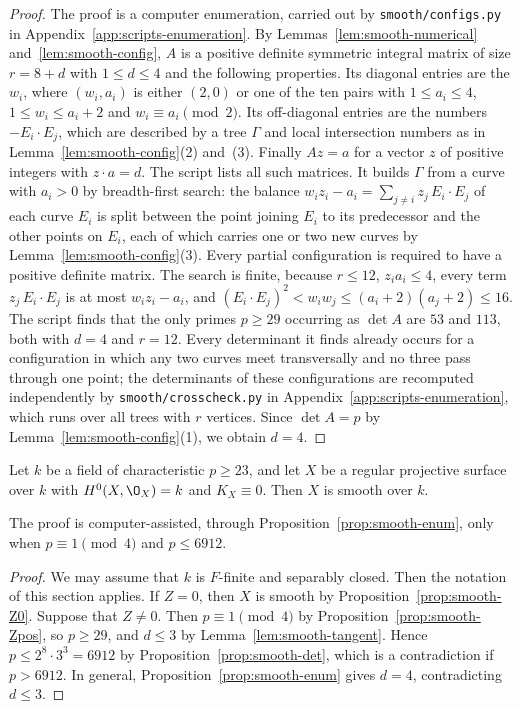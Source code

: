 \begin{proof}
The proof is a computer enumeration, carried out by \texttt{smooth/configs.py} in Appendix~\ref{app:scripts-enumeration}.
By Lemmas~\ref{lem:smooth-numerical} and~\ref{lem:smooth-config}, $A$ is a positive definite symmetric integral matrix of size $r = 8+d$ with $1\leq d\leq 4$ and the following properties.
Its diagonal entries are the $w_i$, where $(w_i,a_i)$ is either $(2,0)$ or one of the ten pairs with $1\leq a_i\leq 4$, $1\leq w_i\leq a_i+2$ and $w_i\equiv a_i\pmod 2$.
Its off-diagonal entries are the numbers $-E_i\cdot E_j$, which are described by a tree $\Gamma$ and local intersection numbers as in Lemma~\ref{lem:smooth-config}(2) and~(3).
Finally $Az = a$ for a vector $z$ of positive integers with $z\cdot a = d$.
The script lists all such matrices.
It builds $\Gamma$ from a curve with $a_i>0$ by breadth-first search: the balance $w_iz_i-a_i = \sum_{j\neq i}z_j\,E_i\cdot E_j$ of each curve $E_i$ is split between the point joining $E_i$ to its predecessor and the other points on $E_i$, each of which carries one or two new curves by Lemma~\ref{lem:smooth-config}(3).
Every partial configuration is required to have a positive definite matrix.
The search is finite, because $r\leq 12$, $z_ia_i\leq 4$, every term $z_j\,E_i\cdot E_j$ is at most $w_iz_i-a_i$, and $(E_i\cdot E_j)^2<w_iw_j\leq(a_i+2)(a_j+2)\leq 16$.
The script finds that the only primes $p\geq 29$ occurring as $\det A$ are $53$ and $113$, both with $d = 4$ and $r = 12$.
Every determinant it finds already occurs for a configuration in which any two curves meet transversally and no three pass through one point; the determinants of these configurations are recomputed independently by \texttt{smooth/crosscheck.py} in Appendix~\ref{app:scripts-enumeration}, which runs over all trees with $r$ vertices.
Since $\det A = p$ by Lemma~\ref{lem:smooth-config}(1), we obtain $d = 4$.
\end{proof}

\begin{theorem}\label{thm:smooth}
Let $k$ be a field of characteristic $p\geq 23$, and let $X$ be a regular projective surface over $k$ with $H^0(X,\O_X) = k$ and $K_X\equiv 0$.
Then $X$ is smooth over $k$.
\end{theorem}

The proof is computer-assisted, through Proposition~\ref{prop:smooth-enum}, only when $p\equiv 1\pmod 4$ and $p\leq 6912$.

\begin{proof}
We may assume that $k$ is $F$-finite and separably closed.
Then the notation of this section applies.
If $Z = 0$, then $X$ is smooth by Proposition~\ref{prop:smooth-Z0}.
Suppose that $Z\neq 0$.
Then $p\equiv 1\pmod 4$ by Proposition~\ref{prop:smooth-Zpos}, so $p\geq 29$, and $d\leq 3$ by Lemma~\ref{lem:smooth-tangent}.
Hence $p\leq 2^8\cdot 3^3 = 6912$ by Proposition~\ref{prop:smooth-det}, which is a contradiction if $p>6912$.
In general, Proposition~\ref{prop:smooth-enum} gives $d = 4$, contradicting $d\leq 3$.
\end{proof}
